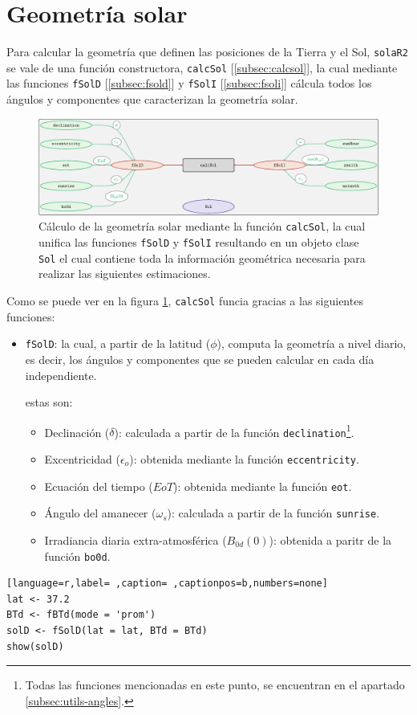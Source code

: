 \section{Geometría solar}
\label{sec:orgf992ff8}
\label{sec:geometria-solar}
Para calcular la geometría que definen las posiciones de la Tierra y el Sol, \texttt{solaR2} se vale de una función constructora, \texttt{calcSol} [\ref{subsec:calcsol}], la cual mediante las funciones \texttt{fSolD} [\ref{subsec:fsold}] y \texttt{fSolI} [\ref{subsec:fsoli}] cálcula todos los ángulos y componentes que caracterizan la geometría solar.
\begin{figure}[]
\centering
\includegraphics[keepaspectratio,width=\textwidth,height=0.5\textheight]{figuras/calcSol.pdf}
\caption{Cálculo de la geometría solar mediante la función \texttt{calcSol}, la cual unifica las funciones \texttt{fSolD} y \texttt{fSolI} resultando en un objeto clase \texttt{Sol} el cual contiene toda la información geométrica necesaria para realizar las siguientes estimaciones. \label{fig:calcSol}}
\end{figure}

Como se puede ver en la figura \ref{fig:calcSol}, \texttt{calcSol} funcia gracias a las siguientes funciones:
\begin{itemize}
\item \texttt{fSolD}: la cual, a partir de la latitud (\(\phi\)), computa la geometría a nivel diario, es decir, los ángulos y componentes que se pueden calcular en cada día independiente.

estas son:
\begin{itemize}
\item Declinación (\(\delta\)): calculada a partir de la función \texttt{declination}\footnote{Todas las funciones mencionadas en este punto, se encuentran en el apartado \ref{subsec:utils-angles}.}.
\item Excentricidad (\(\epsilon_o\)): obtenida mediante la función \texttt{eccentricity}.
\item Ecuación del tiempo (\(EoT\)): obtenida mediante la función \texttt{eot}.
\item Ángulo del amanecer (\(\omega_s\)): calculada a partir de la función \texttt{sunrise}.
\item Irradiancia diaria extra-atmosférica (\(B_{0d}(0)\)): obtenida a paritr de la función \texttt{bo0d}.
\end{itemize}
\end{itemize}
\begin{lstlisting}[language=r,label= ,caption= ,captionpos=b,numbers=none]
lat <- 37.2
BTd <- fBTd(mode = 'prom')
solD <- fSolD(lat = lat, BTd = BTd)
show(solD)
\end{lstlisting}

